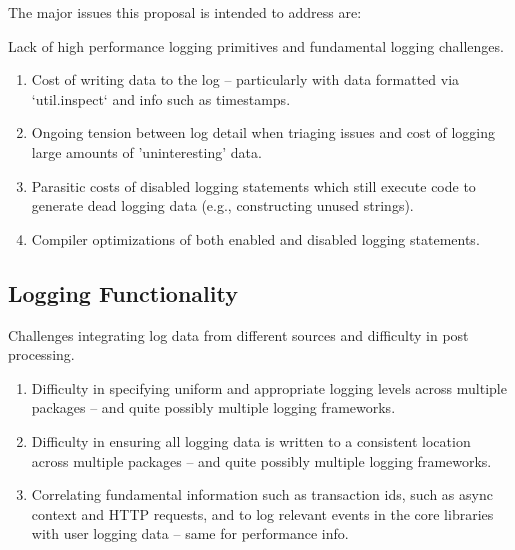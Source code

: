 The major issues this proposal is intended to address are:

\noindent
Lack of high performance logging primitives and fundamental logging challenges.
\begin{enumerate}
 \item Cost of writing data to the log -- particularly with data formatted via 
    `util.inspect` and info such as timestamps.
 \item Ongoing tension between log detail when triaging issues and cost of logging 
    large amounts of 'uninteresting' data.
\item Parasitic costs of disabled logging statements which still execute code to 
    generate dead logging data (e.g., constructing unused strings).
\item Compiler optimizations of both enabled and disabled logging statements.
\end{enumerate}

\subsection{Logging Functionality}
\label{subsec:functionalitydesign}

\noindent
Challenges integrating log data from different sources and difficulty in post processing.
\begin{enumerate}
\item Difficulty in specifying uniform and appropriate logging levels across 
    multiple packages -- and quite possibly multiple logging frameworks.
\item Difficulty in ensuring all logging data is written to a consistent location 
    across multiple packages -- and quite possibly multiple logging frameworks.
\item Correlating fundamental information such as  
    transaction ids, such as async context and HTTP requests, and to log relevant 
    events in the core libraries with user logging data -- same for performance info.
\end{enumerate}

